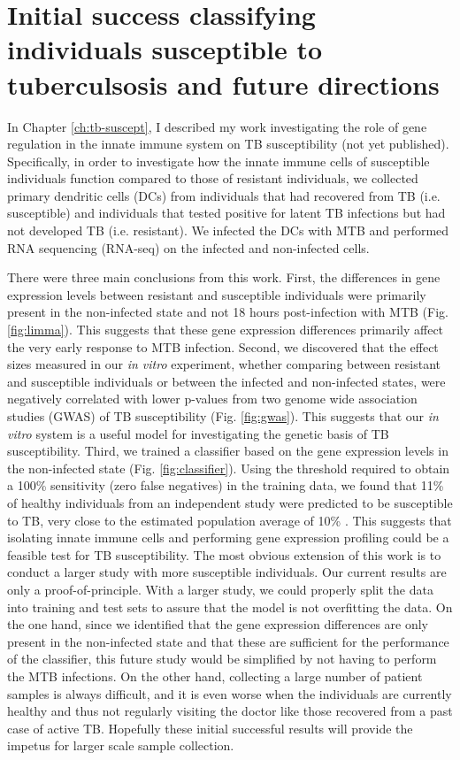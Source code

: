 \section{Initial success classifying individuals susceptible to tuberculsosis and future directions}

In Chapter \ref{ch:tb-suscept}, I described my work investigating the
role of gene regulation in the innate immune system on TB
susceptibility (not yet published). Specifically, in order to
investigate how the innate immune cells of susceptible individuals
function compared to those of resistant individuals, we collected
primary dendritic cells (DCs) from individuals that had recovered from
TB (i.e. susceptible) and individuals that tested positive for latent
TB infections but had not developed TB (i.e. resistant). We infected
the DCs with MTB and performed RNA sequencing (RNA-seq) on the infected and
non-infected cells.

There were three main conclusions from this work. First, the differences
in gene expression levels between resistant and susceptible
individuals were primarily present in the non-infected state and not 18
hours post-infection with MTB (Fig. \ref{fig:limma}). This suggests that these gene
expression differences primarily affect the very early response to MTB
infection. Second, we discovered that the effect sizes measured in our
\emph{in vitro} experiment, whether comparing between resistant and
susceptible individuals or between the infected and non-infected
states, were negatively correlated with lower p-values from two genome
wide association studies (GWAS) of TB susceptibility \citep{Thye2010} (Fig. \ref{fig:gwas}). This suggests
that our \emph{in vitro} system is a useful model for investigating
the genetic basis of TB susceptibility. Third, we trained a classifier
based on the gene expression levels in the non-infected state (Fig. \ref{fig:classifier}). Using
the threshold required to obtain a 100\% sensitivity (zero false negatives) in the
training data, we found that 11\% of healthy individuals from an
independent study \citep{Barreiro2012} were predicted to be susceptible to TB, very close
to the estimated population average of 10\% \citep{North2004, OGarra2013}. This suggests that
isolating innate immune cells and performing gene expression profiling
could be a feasible test for TB susceptibility.  The most obvious
extension of this work is to conduct a larger study with more
susceptible individuals. Our current results are only a
proof-of-principle. With a larger study, we could properly split the
data into training and test sets to assure that the model is not
overfitting the data. On the one hand, since we identified that the
gene expression differences are only present in the non-infected state
and that these are sufficient for the performance of the classifier,
this future study would be simplified by not having to perform the MTB
infections. On the other hand, collecting a large number of patient
samples is always difficult, and it is even worse when the individuals
are currently healthy and thus not regularly visiting the doctor like
those recovered from a past case of active TB. Hopefully these initial
successful results will provide the impetus for larger scale sample
collection.

